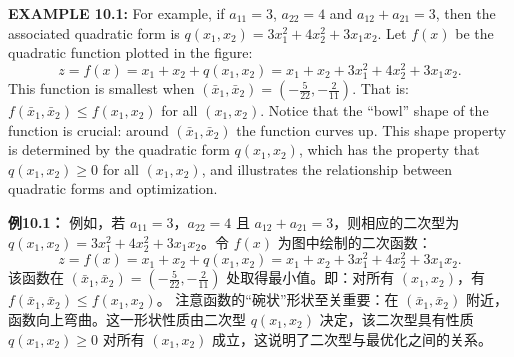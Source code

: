 \begin{original}
\textbf{EXAMPLE 10.1:} For example, if $a_{11}=3$, $a_{22}=4$ and $a_{12}+a_{21}=3$, then the associated quadratic form is $q(x_1,x_2)=3x_1^2+4x_2^2+3x_1x_2$. Let $f(x)$ be the quadratic function plotted in the figure:
\[
z = f(x) = x_1 + x_2 + q(x_1,x_2) = x_1 + x_2 + 3x_1^2 + 4x_2^2 + 3x_1x_2.
\]
This function is smallest when $(\bar{x}_1, \bar{x}_2) = (-\frac{5}{22}, -\frac{2}{11})$. That is: $f(\bar{x}_1, \bar{x}_2) \leq f(x_1, x_2)$ for all $(x_1, x_2)$.
Notice that the ``bowl'' shape of the function is crucial: around $(\bar{x}_1, \bar{x}_2)$ the function curves up. This shape property is determined by the quadratic form $q(x_1, x_2)$, which has the property that $q(x_1, x_2) \geq 0$ for all $(x_1, x_2)$, and illustrates the relationship between quadratic forms and optimization.
\end{original}
\begin{translation}
\textbf{例10.1：} 例如，若 $a_{11}=3$，$a_{22}=4$ 且 $a_{12}+a_{21}=3$，则相应的二次型为 $q(x_1,x_2)=3x_1^2+4x_2^2+3x_1x_2$。令 $f(x)$ 为图中绘制的二次函数：
\[
z = f(x) = x_1 + x_2 + q(x_1,x_2) = x_1 + x_2 + 3x_1^2 + 4x_2^2 + 3x_1x_2.
\]
该函数在 $(\bar{x}_1, \bar{x}_2) = (-\frac{5}{22}, -\frac{2}{11})$ 处取得最小值。即：对所有 $(x_1, x_2)$，有 $f(\bar{x}_1, \bar{x}_2) \leq f(x_1, x_2)$。
注意函数的``碗状''形状至关重要：在 $(\bar{x}_1, \bar{x}_2)$ 附近，函数向上弯曲。这一形状性质由二次型 $q(x_1, x_2)$ 决定，该二次型具有性质 $q(x_1, x_2) \geq 0$ 对所有 $(x_1, x_2)$ 成立，这说明了二次型与最优化之间的关系。
\end{translation}

